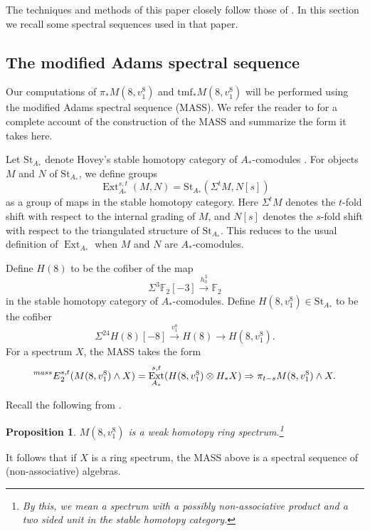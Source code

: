 \documentclass[10pt]{amsart}
\newcommand{\mr}[1]{\mathrm{#1}}
\newcommand{\FF}{\mathbb{F}}
\newcommand{\tmf}{\mathrm{tmf}}
\newcommand{\St}{\mr{St}}
\newtheorem{prop}[equation]{Proposition}
\theoremstyle{definition}
\numberwithin{equation}{section}
\numberwithin{figure}{section}
\DeclareMathOperator{\Ext}{Ext}
\newcommand{\E}[2]{\prescript{#1}{#2}{E}}
\begin{document}
The techniques and methods of this paper closely follow those of \cite{BHHM2}.  In this section we recall some spectral sequences used in that paper.

\subsection*{The modified Adams spectral sequence}

Our computations of $\pi_*M(8,v_1^8)$ and $\tmf_*M(8,v_1^8)$ will be performed using the modified Adams spectral sequence (MASS).  We refer the reader to \cite[Sec. 6]{BHHM2} for a complete account of the construction of the MASS and summarize the form it takes here.

Let $\St_{A_*}$
denote Hovey's stable homotopy category of $A_*$-comodules \cite{Hovey}.  
For objects $M$ and $N$
of $\St_{A_*}$, we define groups
$$ \Ext^{s,t}_{A_*}(M,N) = \St_{A_*}(\Sigma^t M, N[s]) $$
as a group of maps in the stable homotopy category.  Here $\Sigma^t M$ denotes the
$t$-fold shift with respect to the internal grading of $M$, and $N[s]$ denotes
the $s$-fold shift with respect to the triangulated structure of
$\St_{A_*}$.  This
reduces to the usual definition of $\Ext_{A_*}$ when $M$ and $N$ are
$A_*$-comodules.  

Define $H(8)$ to be the cofiber of the map
\begin{equation}\label{eq:H3}
 \Sigma^3 \FF_2[-3] \xrightarrow{h_0^3} \FF_2
 \end{equation}
in the stable homotopy category of $A_*$-comodules.
Define $H(8,v_1^8) \in \St_{A_*}$ to be the cofiber
\begin{equation}\label{eq:H38}
\Sigma^{24}H(8)[-8] \xrightarrow{v_1^8} H(8) \rightarrow H(8,v_1^8).
\end{equation}
For a spectrum $X$, the MASS takes the form
$$ \E{mass}{}_2^{s,t}(M(8,v_1^8) \wedge X) = \Ext^{s,t}_{A_*}(H(8,v_1^8)\otimes H_*X) \Rightarrow \pi_{t-s} M(8,v_1^8) \wedge X. $$

Recall the following from \cite[Prop. 7.1]{BHHM2}.

\begin{prop}\label{prop:ring}
$M(8,v_1^8)$ is a weak homotopy ring spectrum.\footnote{By this, we mean a spectrum with a possibly non-associative product and a two sided unit in the stable homotopy category.}
\end{prop}

It follows that if $X$ is a ring spectrum, the MASS above is a spectral sequence of (non-associative) algebras. 
\end{document}
